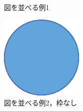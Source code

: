 \begin{figure}[htbp]
  \begin{minipage}{0.5\hsize}
    \begin{center}
    \end{center}
    \caption{図を並べる例1}
    \label{fig:sample2}
  \end{minipage}
  \begin{minipage}{0.5\hsize}
    \begin{center}
       \includegraphics[width=40mm]{./image/image.eps}
    \end{center}
    \caption{図を並べる例2，枠なし}
    \label{fig:sample3}
  \end{minipage}
\end{figure}


